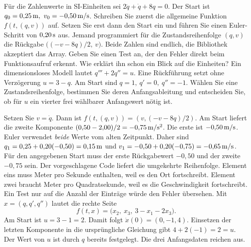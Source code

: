 
Für die Zahlenwerte in SI-Einheiten sei \(2\ddot q+\dot q+8q=0\). Der Start ist \(q_0=0{,}25\unitm m,\ v_0=-0{,}50\unitm{m/s}\). Schreiben Sie zuerst die allgemeine Funktion \(f(t,(q,v))\) auf. Setzen Sie erst dann den Start ein und führen Sie einen Euler-Schritt von \(0{,}20\,\mathrm{s}\) aus.
Jemand programmiert für die Zustandsreihenfolge \((q,v)\) die Rückgabe \(\bigl((-v-8q)/2,\ v\bigr)\). Beide Zahlen sind endlich, die Bibliothek akzeptiert das Array. Geben Sie einen Test an, der den Fehler direkt beim Funktionsaufruf erkennt. Wie erklärt ihn schon ein Blick auf die Einheiten?
Ein dimensionsloses Modell lautet \(q'''+2q''=u\). Eine Rückführung setzt ohne Verzögerung \(u=3-q\). Am Start sind \(q=1,\ q'=0,\ q''=-1\). Wählen Sie eine Zustandsreihenfolge, bestimmen Sie deren Anfangsableitung und entscheiden Sie, ob für \(u\) ein vierter frei wählbarer Anfangswert nötig ist.

\schreibfeld



Setzen Sie \(v=\dot q\). Dann ist \(f(t,(q,v))=(v,(-v-8q)/2)\). Am Start liefert die zweite Komponente \((0{,}50-2{,}00)/2=-0{,}75\,\mathrm{m/s^2}\). Die erste ist \(-0{,}50\,\mathrm{m/s}\). Euler verwendet \emph{beide} Werte vom alten Zeitpunkt. Daher sind \(q_1=0{,}25+0{,}20(-0{,}50)=0{,}15\,\mathrm{m}\) und \(v_1=-0{,}50+0{,}20(-0{,}75)=-0{,}65\,\mathrm{m/s}\).
Für den angegebenen Start muss der erste Rückgabewert \(-0{,}50\) und der zweite \(-0{,}75\) sein. Der vorgeschlagene Code liefert die umgekehrte Reihenfolge. Element eins muss Meter pro Sekunde enthalten, weil es den Ort fortschreibt. Element zwei braucht Meter pro Quadratsekunde, weil es die Geschwindigkeit fortschreibt. Ein Test nur auf die Anzahl der Einträge würde den Fehler übersehen.
Mit \(x=(q,q',q'')\) lautet die rechte Seite
\[
 f(t,x)=\bigl(x_2,\ x_3,\ 3-x_1-2x_3\bigr).
\]
Am Start ist \(u=3-1=2\). Damit folgt \(\dot x(0)=(0,-1,4)\). Einsetzen der letzten Komponente in die ursprüngliche Gleichung gibt \(4+2(-1)=2=u\). Der Wert von \(u\) ist durch \(q\) bereits festgelegt. Die drei Anfangsdaten reichen aus.

